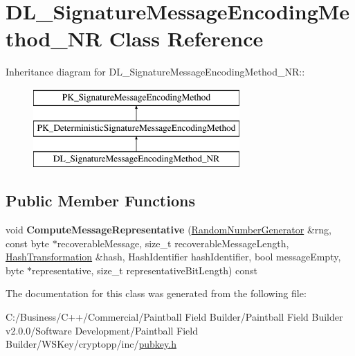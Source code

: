 \hypertarget{class_d_l___signature_message_encoding_method___n_r}{
\section{DL\_\-SignatureMessageEncodingMethod\_\-NR Class Reference}
\label{class_d_l___signature_message_encoding_method___n_r}
}
Inheritance diagram for DL\_\-SignatureMessageEncodingMethod\_\-NR::\begin{figure}[H]
\begin{center}
\leavevmode
\includegraphics[height=3cm]{class_d_l___signature_message_encoding_method___n_r}
\end{center}
\end{figure}
\subsection*{Public Member Functions}
\begin{DoxyCompactItemize}
\item 
\hypertarget{class_d_l___signature_message_encoding_method___n_r_a6a4cf939444c8eea9e47c674f6db6797}{
void {\bfseries ComputeMessageRepresentative} (\hyperlink{class_random_number_generator}{RandomNumberGenerator} \&rng, const byte $\ast$recoverableMessage, size\_\-t recoverableMessageLength, \hyperlink{class_hash_transformation}{HashTransformation} \&hash, HashIdentifier hashIdentifier, bool messageEmpty, byte $\ast$representative, size\_\-t representativeBitLength) const }
\label{class_d_l___signature_message_encoding_method___n_r_a6a4cf939444c8eea9e47c674f6db6797}

\end{DoxyCompactItemize}


The documentation for this class was generated from the following file:\begin{DoxyCompactItemize}
\item 
C:/Business/C++/Commercial/Paintball Field Builder/Paintball Field Builder v2.0.0/Software Development/Paintball Field Builder/WSKey/cryptopp/inc/\hyperlink{pubkey_8h}{pubkey.h}\end{DoxyCompactItemize}
